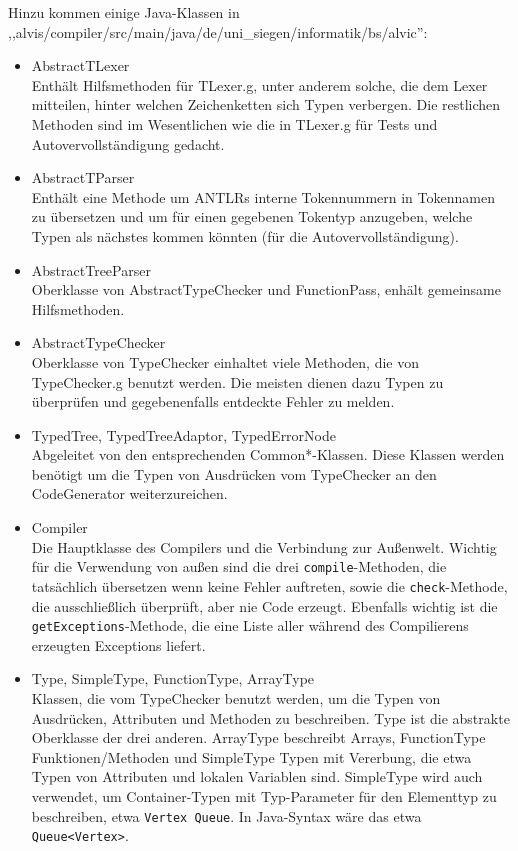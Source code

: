 \documentclass[10pt,a4paper,oneside]{scrbook}
\begin{document}
Hinzu kommen einige Java-Klassen in \\,,alvis/compiler/src/main/java/de/uni\_siegen/informatik/bs/alvic'':
\begin{itemize}
  \item AbstractTLexer\\
    Enthält Hilfsmethoden für TLexer.g, unter anderem solche, die dem Lexer mitteilen, hinter welchen Zeichenketten sich Typen verbergen. Die restlichen Methoden sind im Wesentlichen wie die in TLexer.g für Tests und Autovervollständigung gedacht.
  \item AbstractTParser\\
    Enthält eine Methode um ANTLRs interne Tokennummern in Tokennamen zu übersetzen und um für einen gegebenen Tokentyp anzugeben, welche Typen als nächstes kommen könnten (für die Autovervollständigung).
  \item AbstractTreeParser\\
    Oberklasse von AbstractTypeChecker und FunctionPass, enhält gemeinsame Hilfsmethoden.
  \item AbstractTypeChecker\\
    Oberklasse von TypeChecker einhaltet viele Methoden, die von TypeChecker.g benutzt werden. Die meisten dienen dazu Typen zu überprüfen und gegebenenfalls entdeckte Fehler zu melden.
  \item TypedTree, TypedTreeAdaptor, TypedErrorNode\\
    Abgeleitet von den entsprechenden Common*-Klassen. Diese Klassen werden benötigt um die Typen von Ausdrücken vom TypeChecker an den CodeGenerator weiterzureichen.
  \item Compiler\\
    Die Hauptklasse des Compilers und die Verbindung zur Außenwelt. Wichtig für die Verwendung von außen sind die drei \texttt{compile}-Methoden, die tatsächlich übersetzen wenn keine Fehler auftreten, sowie die \texttt{check}-Methode, die ausschließlich überprüft, aber nie Code erzeugt. Ebenfalls wichtig ist die \linebreak\texttt{getExceptions}-Methode, die eine Liste aller während des Compilierens erzeugten Exceptions liefert.
  \item Type, SimpleType, FunctionType, ArrayType\\
    Klassen, die vom TypeChecker benutzt werden, um die Typen von Ausdrücken, Attributen und Methoden zu beschreiben.
    Type ist die abstrakte Oberklasse der drei anderen. ArrayType beschreibt Arrays, FunctionType Funktionen/Methoden und SimpleType Typen mit Vererbung, die etwa Typen von Attributen und lokalen Variablen sind. SimpleType wird auch verwendet, um Container-Typen mit Typ-Parameter für den Elementtyp zu beschreiben, etwa \texttt{Vertex Queue}. In Java-Syntax wäre das etwa \texttt{Queue<Vertex>}.
   

\end{itemize}
\end{document}
